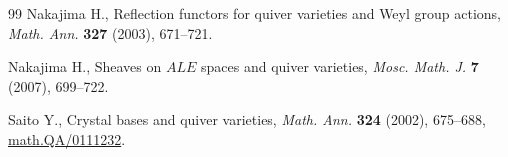 \begin{thebibliography}{99}
Nakajima H.,  Ref\/lection functors for quiver varieties and {W}eyl group
  actions, {\it Math. Ann.} \textbf{327} (2003), 671--721.


Nakajima H.,  Sheaves on $ALE$ spaces and quiver varieties, {\it Mosc. Math. J.}
  \textbf{7} (2007),  699--722.


Saito Y., Crystal bases and quiver varieties, {\it Math. Ann.} \textbf{324}
  (2002),  675--688, \href{http://arxiv.org/abs/math.QA/0111232}{math.QA/0111232}. %



\end{thebibliography}
